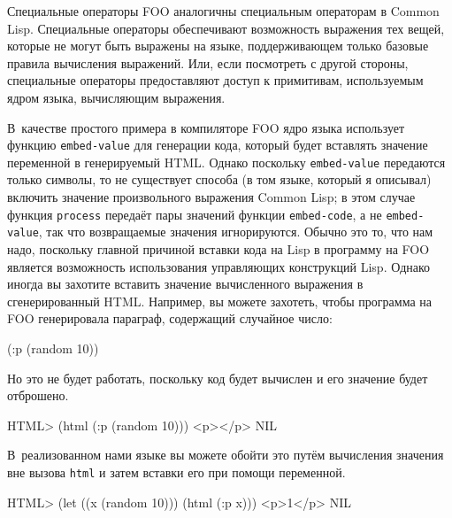 Специальные операторы FOO аналогичны специальным операторам в Common Lisp. Специальные
операторы обеспечивают возможность выражения тех вещей, которые не могут быть выражены на
языке, поддерживающем только базовые правила вычисления выражений.  Или, если посмотреть с
другой стороны, специальные операторы предоставляют доступ к примитивам, используемым
ядром языка, вычисляющим выражения.

В~качестве простого примера в компиляторе FOO ядро языка использует функцию
\lstinline{embed-value} для генерации кода, который будет вставлять значение переменной в
генерируемый HTML.  Однако поскольку \lstinline{embed-value} передаются только символы, то не
существует способа (в том языке, который я описывал) включить значение произвольного
выражения Common Lisp; в этом случае функция \lstinline{process} передаёт пары значений функции
\lstinline{embed-code}, а не \lstinline{embed-value}, так что возвращаемые значения игнорируются.
Обычно это то, что нам надо, поскольку главной причиной вставки кода на Lisp в программу
на FOO является возможность использования управляющих конструкций Lisp.  Однако иногда
вы захотите вставить значение вычисленного выражения в сгенерированный HTML.  Например, вы
можете захотеть, чтобы программа на FOO генерировала параграф, содержащий случайное число:

\begin{myverb}
(:p (random 10))
\end{myverb}

Но это не будет работать, поскольку код будет вычислен и его значение будет отброшено.

\begin{myverb}
HTML> (html (:p (random 10)))
<p></p>
NIL
\end{myverb}

В~реализованном нами языке вы можете обойти это путём вычисления значения вне вызова
\lstinline{html} и затем вставки его при помощи переменной.

\begin{myverb}
HTML> (let ((x (random 10))) (html (:p x)))
<p>1</p>
NIL
\end{myverb}

